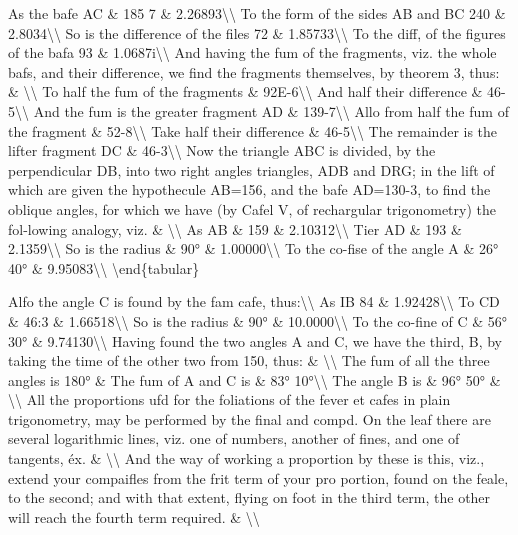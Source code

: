As the bafe AC \& 185 7 \& 2.26893\textbackslash{}\textbackslash{}
To the form of the sides AB and BC 240 \& 2.8034\textbackslash{}\textbackslash{}
So is the difference of the files 72 \& 1.85733\textbackslash{}\textbackslash{}
To the diff, of the figures of the bafa 93 \& 1.0687i\textbackslash{}\textbackslash{}
And having the fum of the fragments, viz. the whole bafs, and their difference, we find the fragments themselves, by theorem 3, thus: \& \textbackslash{}\textbackslash{}
To half the fum of the fragments \& 92E-6\textbackslash{}\textbackslash{}
And half their difference \& 46-5\textbackslash{}\textbackslash{}
And the fum is the greater fragment AD \& 139-7\textbackslash{}\textbackslash{}
Allo from half the fum of the fragment \& 52-8\textbackslash{}\textbackslash{}
Take half their difference \& 46-5\textbackslash{}\textbackslash{}
The remainder is the lifter fragment DC \& 46-3\textbackslash{}\textbackslash{}
Now the triangle ABC is divided, by the perpendicular DB, into two right angles triangles, ADB and DRG; in the lift of which are given the hypothecule AB=156, and the bafe AD=130-3, to find the oblique angles, for which we have (by Cafel V, of rechargular trigonometry) the fol-lowing analogy, viz. \& \textbackslash{}\textbackslash{}
As AB \& 159 \& 2.10312\textbackslash{}\textbackslash{}
Tier AD \& 193 \& 2.1359\textbackslash{}\textbackslash{}
So is the radius \& 90° \& 1.00000\textbackslash{}\textbackslash{}
To the co-fise of the angle A \& 26° 40° \& 9.95083\textbackslash{}\textbackslash{}
\textbackslash{}end\{tabular\}\par\medskip
Alfo the angle C is found by the fam cafe, thus:\textbackslash{}\textbackslash{}
As IB 84 \& 1.92428\textbackslash{}\textbackslash{}
To CD \& 46:3 \& 1.66518\textbackslash{}\textbackslash{}
So is the radius \& 90° \& 10.0000\textbackslash{}\textbackslash{}
To the co-fine of C \& 56° 30° \& 9.74130\textbackslash{}\textbackslash{}
Having found the two angles A and C, we have the third, B, by taking the time of the other two from 150, thus: \& \textbackslash{}\textbackslash{}
The fum of all the three angles is 180° \& The fum of A and C is \& 83° 10°\textbackslash{}\textbackslash{}
The angle B is \& 96° 50° \& \textbackslash{}\textbackslash{}
All the proportions ufd for the foliations of the fever et cafes in plain trigonometry, may be performed by the final and compd. On the leaf there are several logarithmic lines, viz. one of numbers, another of fines, and one of tangents, éx. \& \textbackslash{}\textbackslash{}
And the way of working a proportion by these is this, viz., extend your compaifles from the frit term of your pro portion, found on the feale, to the second; and with that extent, flying on foot in the third term, the other will reach the fourth term required. \& \textbackslash{}\textbackslash{}
